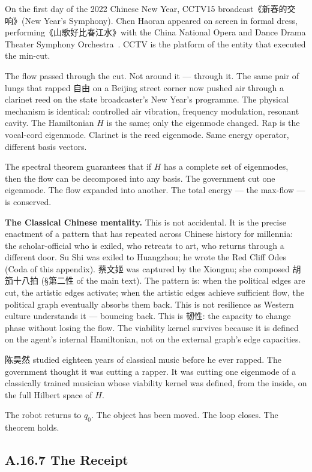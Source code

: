 \documentclass[11pt,a4paper]{article}
\theoremstyle{definition}
\theoremstyle{remark}
\begin{document}
On the first day of the 2022 Chinese New Year, CCTV15 broadcast《新春的交响》(New Year's Symphony). Chen Haoran appeared on screen in formal dress, performing《山歌好比春江水》with the China National Opera and Dance Drama Theater Symphony Orchestra~\cite{zhihu2022}. CCTV is the platform of the entity that executed the min-cut.

The flow passed through the cut. Not around it --- through it. The same pair of lungs that rapped 自由 on a Beijing street corner now pushed air through a clarinet reed on the state broadcaster's New Year's programme. The physical mechanism is identical: controlled air vibration, frequency modulation, resonant cavity. The Hamiltonian $H$ is the same; only the eigenmode changed. Rap is the vocal-cord eigenmode. Clarinet is the reed eigenmode. Same energy operator, different basis vectors.

The spectral theorem guarantees that if $H$ has a complete set of eigenmodes, then the flow can be decomposed into any basis. The government cut one eigenmode. The flow expanded into another. The total energy --- the max-flow --- is conserved.

\textbf{The Classical Chinese mentality.} This is not accidental. It is the precise enactment of a pattern that has repeated across Chinese history for millennia: the scholar-official who is exiled, who retreats to art, who returns through a different door. Su Shi was exiled to Huangzhou; he wrote the Red Cliff Odes (Coda of this appendix). 蔡文姬 was captured by the Xiongnu; she composed 胡笳十八拍 (\S 第二性 of the main text). The pattern is: when the political edges are cut, the artistic edges activate; when the artistic edges achieve sufficient flow, the political graph eventually absorbs them back. This is not resilience as Western culture understands it --- bouncing back. This is 韧性: the capacity to change phase without losing the flow. The viability kernel survives because it is defined on the agent's internal Hamiltonian, not on the external graph's edge capacities.

陈昊然 studied eighteen years of classical music before he ever rapped. The government thought it was cutting a rapper. It was cutting one eigenmode of a classically trained musician whose viability kernel was defined, from the inside, on the full Hilbert space of $H$.

The robot returns to $q_0$. The object has been moved. The loop closes. The theorem holds.


\subsection{A.16.7 The Receipt}
\end{document}
